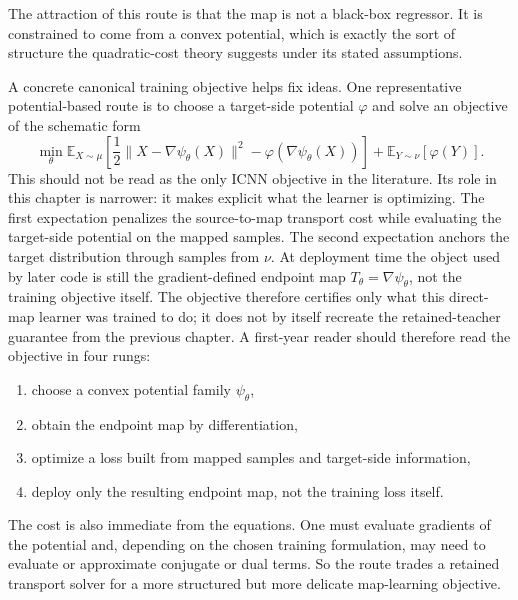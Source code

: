 The attraction of this route is that the map is not a black-box regressor.  It
is constrained to come from a convex potential, which is exactly the sort of
structure the quadratic-cost theory suggests under its stated assumptions.

A concrete canonical training objective helps fix ideas.  One representative
potential-based route is to choose a target-side potential \(\varphi\) and solve
an objective of the schematic form
\begin{equation}
\label{eq:bf-neural-ot-direct-icnn-objective}
  \min_\theta
  \mathbb E_{X\sim\mu}\!
  \left[
    \frac{1}{2}\|X-\nabla\psi_\theta(X)\|^2
    - \varphi(\nabla\psi_\theta(X))
  \right]
  +
  \mathbb E_{Y\sim\nu}[\varphi(Y)].
\end{equation}
This should not be read as the only ICNN objective in the literature.  Its role in
this chapter is narrower: it makes explicit what the learner is optimizing.  The
first expectation penalizes the source-to-map transport cost while evaluating the
target-side potential on the mapped samples.  The second expectation anchors the
target distribution through samples from \(\nu\).  At deployment time the object
used by later code is still the gradient-defined endpoint map
\(T_\theta=\nabla\psi_\theta\), not the training objective itself.  The objective
therefore certifies only what this direct-map learner was trained to do; it does
not by itself recreate the retained-teacher guarantee from the previous chapter.
A first-year reader should therefore read the objective in four rungs:
\begin{enumerate}[label=(\roman*)]
  \item choose a convex potential family \(\psi_\theta\),
  \item obtain the endpoint map by differentiation,
  \item optimize a loss built from mapped samples and target-side information,
  \item deploy only the resulting endpoint map, not the training loss itself.
\end{enumerate}

The cost is also immediate from the equations.  One must evaluate gradients of
the potential and, depending on the chosen training formulation, may need to
evaluate or approximate conjugate or dual terms.  So the route trades a
retained transport solver for a more structured but more delicate
map-learning objective.

